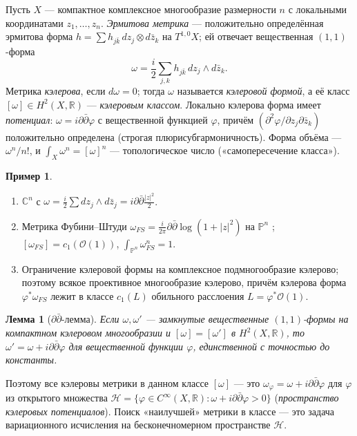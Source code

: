 \documentclass[11pt,a4paper]{article}
\theoremstyle{plain}
\newtheorem{lemma}[theorem]{Лемма}
\theoremstyle{definition}
\newtheorem{example}[theorem]{Пример}
\theoremstyle{remark}
\renewcommand{\C}{\mathbb{C}}
\newcommand{\R}{\mathbb{R}}
\newcommand{\PP}{\mathbb{P}}
\newcommand{\cO}{\mathcal{O}}
\begin{document}
Пусть $X$ --- компактное комплексное многообразие размерности $n$ с локальными координатами
$z_1,\dots,z_n$. \emph{Эрмитова метрика} --- положительно определённая эрмитова форма
$h=\sum h_{j\bar k}\,dz_j\otimes d\bar z_k$ на $T^{1,0}X$; ей отвечает вещественная $(1,1)$-форма
\[
\omega=\frac i2\sum_{j,k}h_{j\bar k}\,dz_j\wedge d\bar z_k .
\]
Метрика \emph{кэлерова}, если $d\omega=0$; тогда $\omega$ называется \emph{кэлеровой формой}, а её
класс $[\omega]\in H^2(X,\R)$ --- \emph{кэлеровым классом}. Локально кэлерова форма имеет
\emph{потенциал}: $\omega=i\partial\bar\partial\varphi$ с вещественной функцией $\varphi$, причём
$(\partial^2\varphi/\partial z_j\partial\bar z_k)$ положительно определена (строгая
плюрисубгармоничность). Форма объёма --- $\omega^n/n!$, и $\int_X\omega^n=[\omega]^n$ --- топологическое
число («самопересечение класса»).

\begin{example}
\begin{enumerate}
\item $\C^n$ с $\omega=\frac i2\sum dz_j\wedge d\bar z_j=i\partial\bar\partial\frac{|z|^2}2$.
\item Метрика Фубини--Штуди $\omega_{FS}=\frac i{2\pi}\partial\bar\partial\log(1+|z|^2)$ на $\PP^n$
\cite[пример~6.5]{AG}; $[\omega_{FS}]=c_1(\cO(1))$, $\int_{\PP^n}\omega_{FS}^n=1$.
\item Ограничение кэлеровой формы на комплексное подмногообразие кэлерово; поэтому всякое проективное
многообразие кэлерово, причём кэлерова форма $\varphi^*\omega_{FS}$ лежит в классе $c_1(L)$
обильного расслоения $L=\varphi^*\cO(1)$.
\end{enumerate}
\end{example}

\begin{lemma}[$\partial\bar\partial$-лемма]\label{lem:ddbar}
Если $\omega,\omega'$ --- замкнутые вещественные $(1,1)$-формы на компактном кэлеровом многообразии и
$[\omega]=[\omega']$ в $H^2(X,\R)$, то $\omega'=\omega+i\partial\bar\partial\varphi$ для вещественной
функции $\varphi$, единственной с точностью до константы.
\end{lemma}

Поэтому все кэлеровы метрики в данном классе $[\omega]$ --- это $\omega_\varphi=\omega+i\partial\bar\partial\varphi$
для $\varphi$ из открытого множества
$\mathcal H=\{\varphi\in C^\infty(X,\R):\omega+i\partial\bar\partial\varphi>0\}$ (\emph{пространство
кэлеровых потенциалов}). Поиск «наилучшей» метрики в классе --- это задача вариационного исчисления
на бесконечномерном пространстве $\mathcal H$.
\end{document}
